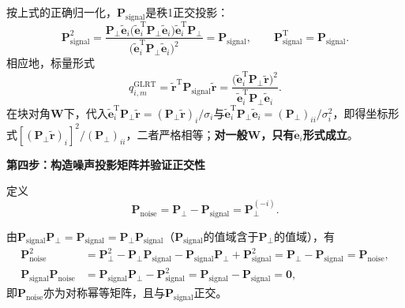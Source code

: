 \documentclass[UTF8,a4paper,zihao=-4]{ctexart}
\begin{document}
按上式的正确归一化，$\mathbf{P}_{\text{signal}}$是秩1正交投影：
\begin{equation}
\mathbf{P}_{\text{signal}}^2
=\frac{\mathbf{P}_{\perp}\widetilde{\mathbf{e}}_i
\bigl(\widetilde{\mathbf{e}}_i^{\mathrm{T}}\mathbf{P}_{\perp}\widetilde{\mathbf{e}}_i\bigr)
\widetilde{\mathbf{e}}_i^{\mathrm{T}}\mathbf{P}_{\perp}}
{\bigl(\widetilde{\mathbf{e}}_i^{\mathrm{T}}\mathbf{P}_{\perp}\widetilde{\mathbf{e}}_i\bigr)^2}
=\mathbf{P}_{\text{signal}},\qquad
\mathbf{P}_{\text{signal}}^{\mathrm{T}}=\mathbf{P}_{\text{signal}}.
\end{equation}
相应地，标量形式
\begin{equation}
q^{\mathrm{GLRT}}_{i,m}=\widetilde{\mathbf{r}}^{\mathrm{T}}\mathbf{P}_{\text{signal}}\widetilde{\mathbf{r}}
=\frac{\bigl(\widetilde{\mathbf{e}}_i^{\mathrm{T}}\mathbf{P}_{\perp}\widetilde{\mathbf{r}}\bigr)^2}{\widetilde{\mathbf{e}}_i^{\mathrm{T}}\mathbf{P}_{\perp}\widetilde{\mathbf{e}}_i}.
\end{equation}
在块对角\(\mathbf{W}\)下，代入\(\widetilde{\mathbf{e}}_i^{\mathrm{T}}\mathbf{P}_{\perp}\widetilde{\mathbf{r}}=(\mathbf{P}_{\perp}\widetilde{\mathbf{r}})_i/\sigma_i\)与\(\widetilde{\mathbf{e}}_i^{\mathrm{T}}\mathbf{P}_{\perp}\widetilde{\mathbf{e}}_i=(\mathbf{P}_{\perp})_{ii}/\sigma_i^2\)，即得坐标形式\([(\mathbf{P}_{\perp}\widetilde{\mathbf{r}})_i]^2/(\mathbf{P}_{\perp})_{ii}\)，二者严格相等；\textbf{对一般\(\mathbf{W}\)，只有\(\widetilde{\mathbf{e}}_i\)形式成立}。

\noindent\textbf{第四步：构造噪声投影矩阵并验证正交性}\par

定义
\begin{equation}
\mathbf{P}_{\text{noise}} = \mathbf{P}_{\perp} - \mathbf{P}_{\text{signal}} = \mathbf{P}_{\perp}^{(-i)}.
\end{equation}

由\(\mathbf{P}_{\text{signal}}\mathbf{P}_{\perp}=\mathbf{P}_{\text{signal}}=\mathbf{P}_{\perp}\mathbf{P}_{\text{signal}}\)（\(\mathbf{P}_{\text{signal}}\)的值域含于\(\mathbf{P}_{\perp}\)的值域），有
\begin{align}
\mathbf{P}_{\text{noise}}^2
&=\mathbf{P}_{\perp}^2-\mathbf{P}_{\perp}\mathbf{P}_{\text{signal}}
-\mathbf{P}_{\text{signal}}\mathbf{P}_{\perp}+\mathbf{P}_{\text{signal}}^2
=\mathbf{P}_{\perp}-\mathbf{P}_{\text{signal}}=\mathbf{P}_{\text{noise}},\\
\mathbf{P}_{\text{signal}}\mathbf{P}_{\text{noise}}
&=\mathbf{P}_{\text{signal}}\mathbf{P}_{\perp}-\mathbf{P}_{\text{signal}}^2
=\mathbf{P}_{\text{signal}}-\mathbf{P}_{\text{signal}}=\mathbf{0},
\end{align}
即\(\mathbf{P}_{\text{noise}}\)亦为对称幂等矩阵，且与\(\mathbf{P}_{\text{signal}}\)正交。
\end{document}
